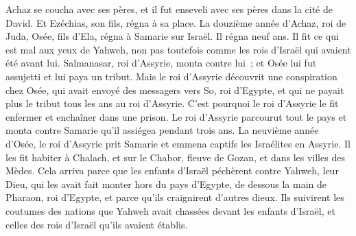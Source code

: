 \begin{multicols}{2}
Achaz se coucha avec ses pères, et il fut enseveli avec ses pères dans la cité de David. Et Ezéchias, son fils, régna à sa place.
\VerseOne{}La douzième année d'Achaz, roi de Juda, Osée, fils d'Ela, régna à Samarie sur Israël. Il régna neuf ans.
Il fit ce qui est mal aux yeux de Yahweh, non pas toutefois comme les rois d'Israël qui avaient été avant lui.
Salmanasar, roi d'Assyrie, monta contre lui~; et Osée lui fut assujetti et lui paya un tribut.
Mais le roi d'Assyrie découvrit une conspiration chez Osée, qui avait envoyé des messagers vers So, roi d'Egypte, et qui ne payait plus le tribut tous les ans au roi d'Assyrie. C'est pourquoi le roi d'Assyrie le fit enfermer et enchaîner dans une prison.
Le roi d'Assyrie parcourut tout le pays et monta contre Samarie qu'il assiégea pendant trois ans.
La neuvième année d'Osée, le roi d'Assyrie prit Samarie et emmena captifs les Israélites en Assyrie. Il les fit habiter à Chalach, et sur le Chabor, fleuve de Gozan, et dans les villes des Mèdes.
Cela arriva parce que les enfants d'Israël péchèrent contre Yahweh, leur Dieu, qui les avait fait monter hors du pays d'Egypte, de dessous la main de Pharaon, roi d'Egypte, et parce qu'ils craignirent d'autres dieux.
Ils suivirent les coutumes des nations que Yahweh avait chassées devant les enfants d'Israël, et celles des rois d'Israël qu'ils avaient établis.

\end{multicols}
